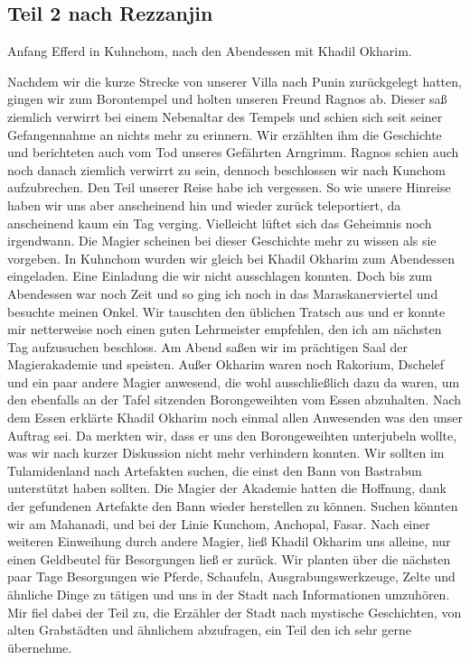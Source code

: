 \subsection{Teil 2 nach Rezzanjin}

Anfang Efferd in Kuhnchom, nach den Abendessen mit Khadil Okharim.

Nachdem wir die kurze Strecke von unserer Villa nach Punin zurückgelegt hatten, gingen wir zum Borontempel und holten unseren Freund Ragnos ab. Dieser saß ziemlich verwirrt bei einem Nebenaltar des Tempels und schien sich seit seiner Gefangennahme an nichts mehr zu erinnern. Wir erzählten ihm die Geschichte und berichteten auch vom Tod unseres Gefährten Arngrimm. Ragnos schien auch noch danach ziemlich verwirrt zu sein, dennoch beschlossen wir nach Kunchom aufzubrechen. Den Teil unserer Reise habe ich vergessen. So wie unsere Hinreise haben wir uns aber anscheinend hin und wieder zurück teleportiert, da anscheinend kaum ein Tag verging. Vielleicht lüftet sich das Geheimnis noch irgendwann. Die Magier scheinen bei dieser Geschichte mehr zu wissen als sie vorgeben.
In Kuhnchom wurden wir gleich bei Khadil Okharim zum Abendessen eingeladen. Eine Einladung die wir nicht ausschlagen konnten. Doch bis zum Abendessen war noch Zeit und so ging ich noch in das Maraskanerviertel und besuchte meinen Onkel. Wir tauschten den üblichen Tratsch aus und er konnte mir netterweise noch einen guten Lehrmeister empfehlen, den ich am nächsten Tag aufzusuchen beschloss. Am Abend saßen wir im prächtigen Saal der Magierakademie und speisten. Außer Okharim waren noch Rakorium, Dschelef und ein paar andere Magier anwesend, die wohl ausschließlich dazu da waren, um den ebenfalls an der Tafel sitzenden Borongeweihten vom Essen abzuhalten. Nach dem Essen erklärte Khadil Okharim noch einmal allen Anwesenden was den unser Auftrag sei. Da merkten wir, dass er uns den Borongeweihten unterjubeln wollte, was wir nach kurzer Diskussion nicht mehr verhindern konnten. Wir sollten im Tulamidenland nach Artefakten suchen, die einst den Bann von Bastrabun unterstützt haben sollten. Die Magier der Akademie hatten die Hoffnung, dank der gefundenen Artefakte den Bann wieder herstellen zu können. Suchen könnten wir am Mahanadi, und bei der Linie Kunchom, Anchopal, Fasar. Nach einer weiteren Einweihung durch andere Magier, ließ Khadil Okharim uns alleine, nur einen Geldbeutel für Besorgungen ließ er zurück. Wir planten über die nächsten paar Tage Besorgungen wie Pferde, Schaufeln, Ausgrabungswerkzeuge, Zelte und ähnliche Dinge zu tätigen und uns in der Stadt nach Informationen umzuhören. Mir fiel dabei der Teil zu, die Erzähler der Stadt nach mystische Geschichten, von alten Grabstädten und ähnlichem abzufragen, ein Teil den ich sehr gerne übernehme.

